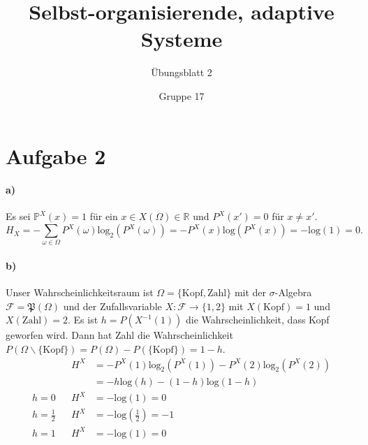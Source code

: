 \documentclass{scrartcl}
\begin{document}
\title{Selbst-organisierende, adaptive Systeme}
\subtitle{Übungsblatt 2}
\author{Gruppe 17}

\maketitle

\section{Aufgabe 2}
\paragraph{a)}
Es sei $\mathbb{P}^X(x) = 1$ für ein $x \in X(\Omega) \in \mathbb{R}$ und $P^X(x') = 0$ für $x \neq x'$.
\[
    H_X = - \sum_{\omega \in \Omega} P^X(\omega)\mathrm{log}_2(P^X(\omega)) = -P^X(x)\mathrm{log}(P^X(x)) = -\mathrm{log}(1) = 0.
\]

\paragraph{b)}
Unser Wahrscheinlichkeitsraum ist
$\Omega = \{ \mathrm{Kopf}, \mathrm{Zahl} \}$ mit der $\sigma$-Algebra
$\mathcal{F} = \mathfrak{P}(\Omega)$ und der Zufallsvariable
$X : \mathcal F \to \{ 1, 2 \}$ mit $X(\mathrm{Kopf}) = 1$ und $X(\mathrm{Zahl}) = 2$.
Es ist $h = P(X^{-1}(1))$ die Wahrscheinlichkeit, dass Kopf geworfen wird. Dann
hat Zahl die Wahrscheinlichkeit $P(\Omega\backslash\{\mathrm{Kopf}\}) = P(\Omega) - P(\{\mathrm{Kopf}\}) = 1 - h$.
\begin{align*}
          && H^X & = -P^X(1)\mathrm{log}_2(P^X(1)) - P^X(2)\mathrm{log}_2(P^X(2)) \\
          &&     & = -h\mathrm{log}(h) - (1 - h)\mathrm{log}(1 - h) \\
    h = 0 && H^X & = -\mathrm{log}(1) = 0 \\
    h = \frac{1}{2} && H^X & = -\mathrm{log}\left(\frac{1}{2}\right) = -1 \\
    h = 1 && H^X & = -\mathrm{log}(1) = 0
\end{align*}
\end{document}
